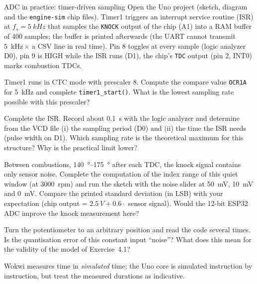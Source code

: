 \begin{exercise}{ADC in practice: timer-driven sampling}{\Wokwi}
Open the Uno project  (sketch, diagram and the
\texttt{engine-sim} chip files). Timer1 triggers an interrupt service routine
(ISR) at $f_s=\SI{5}{kHz}$ that samples the \texttt{KNOCK} output of the chip
(A1) into a RAM buffer of 400 samples; the buffer is printed afterwards (the
UART cannot transmit \SI{5}{kHz}\,$\times$ a CSV line in real time). Pin 8
toggles at every sample (logic analyzer D0), pin 9 is HIGH while the ISR runs
(D1), the chip's \texttt{TDC} output (pin 2, INT0) marks combustion TDCs.
\begin{tasks}
  \item Timer1 runs in CTC mode with prescaler 8. Compute the compare value
    \texttt{OCR1A} for \SI{5}{kHz} and complete \texttt{timer1\_start()}. What
    is the lowest sampling rate possible with this prescaler?
  \item Complete the ISR. Record about \SI{0.1}{s} with the logic analyzer
    and determine from the VCD file (i) the sampling period (D0) and (ii) the
    time the ISR needs (pulse width on D1). Which sampling rate is the
    theoretical maximum for this structure? Why is the practical limit lower?
  \item Between combustions, \SIrange{140}{175}{\degree} after each TDC, the
    knock signal contains only sensor noise. Complete the computation of the
    index range of this quiet window (at \SI{3000}{rpm}) and run the sketch
    with the noise slider at \SI{50}{mV}, \SI{10}{mV} and \SI{0}{mV}. Compare
    the printed standard deviation (in LSB) with your expectation
    (chip output = $\SI{2.5}{V}+0.6\cdot$ sensor signal). Would the 12-bit ESP32
    ADC improve the knock measurement here?
  \item Turn the potentiometer to an arbitrary position and read the code
    several times. Is the quantisation error of this constant input
    ``noise''? What does this mean for the validity of the model of
    Exercise~4.1?
\end{tasks}
\begin{hint}
Wokwi measures time in \emph{simulated} time; the Uno core is simulated
instruction by instruction, but treat the measured durations as indicative.
\end{hint}
\end{exercise}

